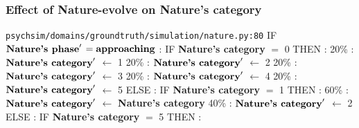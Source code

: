 \documentclass{article}%
\begin{document}
\subsubsection{Effect of Nature{-}evolve on Nature's category}%
\label{ssubsec:Effect of Nature{-}evolve on Nature's category}%
\begin{flushleft}%
\verb|psychsim/domains/groundtruth/simulation/nature.py:80|%
\linebreak%
IF %
$\mbox{\textbf{Nature's phase}} '$%
\linebreak%
\hspace*{2em}%
$= \mbox{\textbf{approaching}}$%
: %
IF %
\textbf{Nature's category}%
$=$%
0%
\linebreak%
\hspace*{4em}%
THEN %
: %
\linebreak%
\hspace*{6em}%
20\%%
: %
$\mbox{\textbf{Nature's category}} '$%
$\leftarrow$%
1%
\linebreak%
\hspace*{6em}%
20\%%
: %
$\mbox{\textbf{Nature's category}} '$%
$\leftarrow$%
2%
\linebreak%
\hspace*{6em}%
20\%%
: %
$\mbox{\textbf{Nature's category}} '$%
$\leftarrow$%
3%
\linebreak%
\hspace*{6em}%
20\%%
: %
$\mbox{\textbf{Nature's category}} '$%
$\leftarrow$%
4%
\linebreak%
\hspace*{6em}%
20\%%
: %
$\mbox{\textbf{Nature's category}} '$%
$\leftarrow$%
5%
\linebreak%
\hspace*{4em}%
ELSE %
: %
IF %
\textbf{Nature's category}%
$=$%
1%
\linebreak%
\hspace*{6em}%
THEN %
: %
\linebreak%
\hspace*{8em}%
60\%%
: %
$\mbox{\textbf{Nature's category}} '$%
$\leftarrow$%
\textbf{Nature's category}%
\linebreak%
\hspace*{8em}%
40\%%
: %
$\mbox{\textbf{Nature's category}} '$%
$\leftarrow$%
2%
\linebreak%
\hspace*{6em}%
ELSE %
: %
IF %
\textbf{Nature's category}%
$=$%
5%
\linebreak%
\hspace*{8em}%
THEN %
: %
\linebreak%

\end{flushleft}
\end{document}

